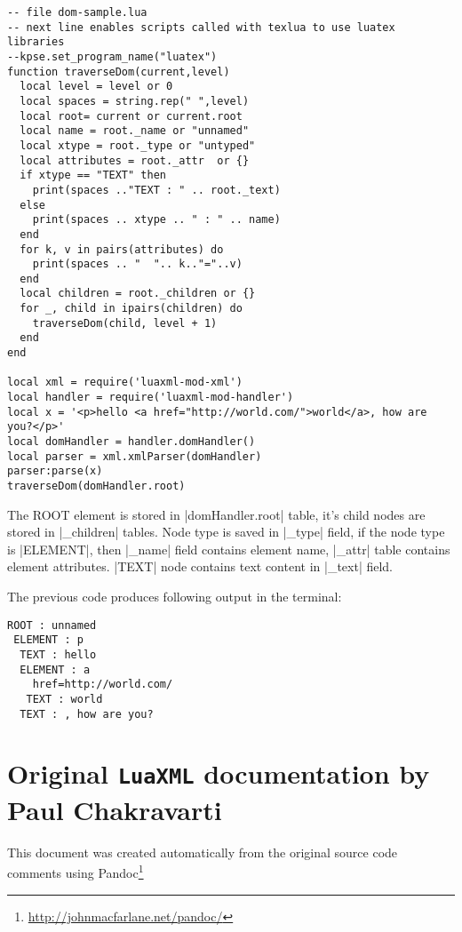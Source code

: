 \documentclass{ltxdoc}
\begin{document}
\begin{verbatim}
-- file dom-sample.lua
-- next line enables scripts called with texlua to use luatex libraries
--kpse.set_program_name("luatex")
function traverseDom(current,level)
  local level = level or 0
  local spaces = string.rep(" ",level)
  local root= current or current.root
  local name = root._name or "unnamed"
  local xtype = root._type or "untyped"
  local attributes = root._attr  or {} 
  if xtype == "TEXT" then 
    print(spaces .."TEXT : " .. root._text)
  else	 
    print(spaces .. xtype .. " : " .. name) 
  end
  for k, v in pairs(attributes) do
    print(spaces .. "  ".. k.."="..v)
  end
  local children = root._children or {}
  for _, child in ipairs(children) do
    traverseDom(child, level + 1)
  end
end

local xml = require('luaxml-mod-xml')
local handler = require('luaxml-mod-handler')
local x = '<p>hello <a href="http://world.com/">world</a>, how are you?</p>'
local domHandler = handler.domHandler()
local parser = xml.xmlParser(domHandler)
parser:parse(x)
traverseDom(domHandler.root)
\end{verbatim}

The ROOT element is stored in |domHandler.root| table, it's child nodes are stored in |_children|
tables. Node type is saved in |_type| field, if the node type is |ELEMENT|, then |_name| field contains 
element name, |_attr| table contains element attributes. |TEXT| node contains text content in |_text| 
field.

The previous code produces following output in the terminal: %

\begin{verbatim}
ROOT : unnamed
 ELEMENT : p
  TEXT : hello
  ELEMENT : a
    href=http://world.com/
   TEXT : world
  TEXT : , how are you?
\end{verbatim}



\clearpage
\part{Original \texttt{LuaXML} documentation by Paul Chakravarti}
\medskip

\noindent This document was created automatically from the original source code comments using Pandoc\footnote{\url{http://johnmacfarlane.net/pandoc/}} 
\end{document}
